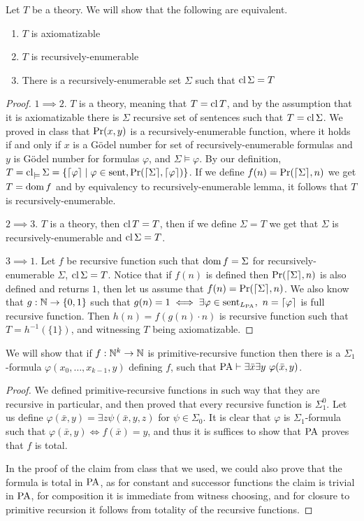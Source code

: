 \question{}
Let $T$ be a theory.
We will show that the following are equivalent.
\begin{enumerate}
	\item $T$ is axiomatizable
	\item $T$ is recursively-enumerable
	\item There is a recursively-enumerable set $\Sigma$ such that $\operatorname{cl} \Sigma = T$
\end{enumerate}
\begin{proof}
	$1 \implies 2$.
	$T$ is a theory, meaning that $T = \operatorname{cl} T$, and by the assumption that it is axiomatizable there is $\Sigma$ recursive set of sentences such that $T = \operatorname{cl} \Sigma$.
	We proved in class that $\operatorname{Pr}(x, y)$ is a recursively-enumerable function,
	where it holds if and only if $x$ is a Gödel number for set of recursively-enumerable formulas and $y$ is Gödel number for formulas $\varphi$, and $\Sigma \models \varphi$.
	By our definition, $T = \operatorname{cl}_{\models} \Sigma = \{ \lceil \varphi \rceil \mid \varphi \in \operatorname{sent}, \operatorname{Pr}(\lceil \Sigma \rceil, \lceil \varphi \rceil) \}$.
	If we define $f(n) = \operatorname{Pr}(\lceil \Sigma \rceil, n)$ we get $T = \operatorname{dom} f$ and by equivalency to recursively-enumerable lemma, it follows that $T$ is recursively-enumerable.

	$2 \implies 3$.
	$T$ is a theory, then $\operatorname{cl} T = T$, then if we define $\Sigma = T$ we get that $\Sigma$ is recursively-enumerable and $\operatorname{cl} \Sigma = T$.

	$3 \implies 1$.
	Let $f$ be recursive function such that $\operatorname{dom} f = \Sigma$ for recursively-enumerable $\Sigma$, $\operatorname{cl} \Sigma = T$.
	Notice that if $f(n)$ is defined then $\operatorname{Pr}(\lceil \Sigma \rceil, n)$ is also defined and returns $1$, then let us assume that $f(n) = \operatorname{Pr}(\lceil \Sigma \rceil, n)$.
	We also know that $g : \mathbb{N} \to \{ 0, 1 \}$ such that $g(n) = 1 \iff \exists \varphi \in \sent_{L_{\PA}},\ n = \lceil \varphi \rceil$ is full recursive function.
	Then $h(n) = f(g(n) \cdot n)$ is recursive function such that $T = h^{-1}(\{ 1 \})$, and witnessing $T$ being axiomatizable.
\end{proof}

\question{}
\subquestion{}
We will show that if $f : \mathbb{N}^k \to \mathbb{N}$ is primitive-recursive function then there is a $\Sigma_1$-formula $\varphi(x_0, \ldots, x_{k - 1}, y)$ defining $f$,
such that $\operatorname{PA} \vdash \exists \bar{x} \exists y\ \varphi(\bar{x}, y)$.
\begin{proof}
	We defined primitive-recursive functions in such way that they are recursive in particular, and then proved that every recursive function is $\Sigma_1^0$.
	Let us define $\varphi(\bar{x}, y) = \exists z \psi(\bar{x}, y, z)$ for $\psi \in \Sigma_0$.
	It is clear that $\varphi$ is $\Sigma_1$-formula such that $\varphi(\bar{x}, y) \iff f(\bar{x}) = y$, and thus it is suffices to show that $\operatorname{PA}$ proves that $f$ is total.

	In the proof of the claim from class that we used, we could also prove that the formula is total in $\operatorname{PA}$,
	as for constant and successor functions the claim is trivial in $\operatorname{PA}$, for composition it is immediate from witness choosing, and for closure to primitive recursion it follows from totality of the recursive functions.
\end{proof}

